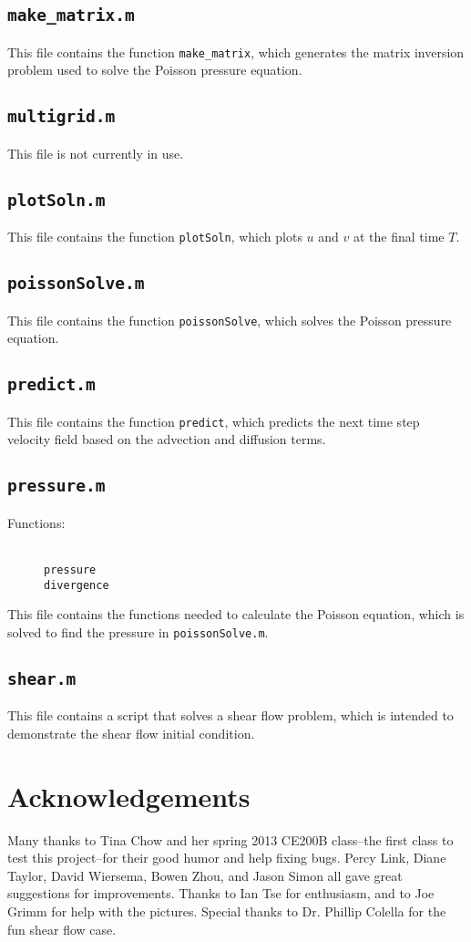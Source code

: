 \documentclass[12pt]{article}
\begin{document}
\subsection{\texttt{make\_matrix.m}}
This file contains the function \texttt{make\_matrix}, which generates the matrix inversion problem used to solve the Poisson pressure equation.

\subsection{\texttt{multigrid.m}}
This file is not currently in use.

\subsection{\texttt{plotSoln.m}}
This file contains the function \texttt{plotSoln}, which plots $u$ and $v$ at the final time $T$.

\subsection{\texttt{poissonSolve.m}}
This file contains the function \texttt{poissonSolve}, which solves the Poisson pressure equation.

\subsection{\texttt{predict.m}}
This file contains the function \texttt{predict}, which predicts the next time step velocity field based on the advection and diffusion terms.

\subsection{\texttt{pressure.m}}
\begin{description}
\item[Functions:] \hfill \\ \texttt{pressure} \\ \texttt{divergence} 
\end{description}
This file contains the functions needed to calculate the Poisson equation, which is solved to find the pressure in \texttt{poissonSolve.m}.

\subsection{\texttt{shear.m}}
This file contains a script that solves a shear flow problem, which is intended to demonstrate the shear flow initial condition.

\section{Acknowledgements}

Many thanks to Tina Chow and her spring 2013 CE200B class--the first class to test this project--for their good humor and help fixing bugs.  Percy Link, Diane Taylor, David Wiersema, Bowen Zhou, and Jason Simon all gave great suggestions for improvements.  Thanks to Ian Tse for enthusiasm, and to Joe Grimm for help with the pictures.  Special thanks to Dr. Phillip Colella for the fun shear flow case.
\end{document}
